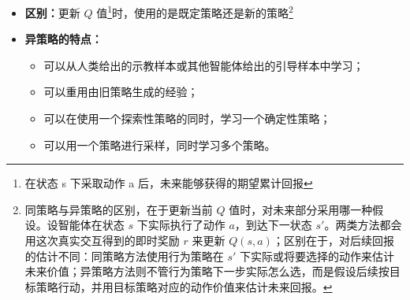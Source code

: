 \documentclass[../main.tex]{subfiles}
\begin{document}
\begin{enumerate}
\begin{enumerate}
\begin{itemize}
            \item \textbf{区别：}更新 $Q$ 值\footnote{在状态 s 下采取动作 a 后，未来能够获得的期望累计回报}时，使用的是既定策略还是新的策略\footnote{同策略与异策略的区别，在于更新当前 $Q$ 值时，对未来部分采用哪一种假设。设智能体在状态 $s$ 下实际执行了动作 $a$，到达下一状态 $s'$。两类方法都会用这次真实交互得到的即时奖励 $r$ 来更新 $Q(s,a)$；区别在于，对后续回报的估计不同：同策略方法使用行为策略在 $s'$ 下实际或将要选择的动作来估计未来价值；异策略方法则不管行为策略下一步实际怎么选，而是假设后续按目标策略行动，并用目标策略对应的动作价值来估计未来回报。}
            \item \textbf{异策略的特点：}
            \begin{itemize}
                \item 可以从人类给出的示教样本或其他智能体给出的引导样本中学习；
                \item 可以重用由旧策略生成的经验；
                \item 可以在使用一个探索性策略的同时，学习一个确定性策略；
                \item 可以用一个策略进行采样，同时学习多个策略。
            \end{itemize}
        \end{itemize}
    \end{enumerate}
\end{enumerate}
\end{document}
